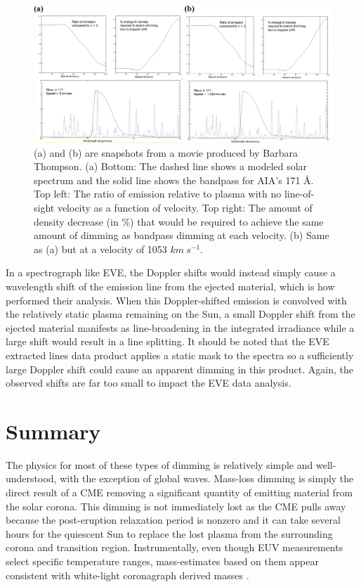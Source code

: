 \begin{figure}[!h]
    \caption[Bandpass dimming]{
        (a) and (b) are snapshots from a movie produced by Barbara Thompson. 
        (a) Bottom: The dashed line shows a modeled solar spectrum and the solid line shows the bandpass for AIA's 171 \AA. 
        Top left: The ratio of emission relative to plasma with no line-of-sight velocity as a function of velocity. 
        Top right: The amount of density decrease (in \%) that would be required to achieve the same amount of dimming as 
        bandpass dimming at each velocity. 
        (b) Same as (a) but at a velocity of 1053 $km\ s^{-1}$. 
    }
    \begin{center}
        \includegraphics[width=166mm]{Images/BandpassDimming.png}
    \end{center}
    \label{bandpassDimming}
\end{figure}

In a spectrograph like EVE, the Doppler shifts would instead simply cause a wavelength shift of the emission line from the ejected material, which is how \citet{Hudson2011} performed their analysis. When this Doppler-shifted emission is convolved with the relatively static plasma remaining on the Sun, a small Doppler shift from the ejected material manifests as line-broadening in the integrated irradiance while a large shift would result in a line splitting. It should be noted that the EVE extracted lines data product applies a static mask to the spectra so a sufficiently large Doppler shift could cause an apparent dimming in this product. Again, the observed shifts are far too small to impact the EVE data analysis.



\section{Summary}
The physics for most of these types of dimming is relatively simple and well-understood, with the exception of global waves. Mass-loss dimming is simply the direct result of a CME removing a significant quantity of emitting material from the solar corona. This dimming is not immediately lost as the CME pulls away because the post-eruption relaxation period is nonzero and it can take several hours for the quiescent Sun to replace the lost plasma from the surrounding corona and transition region. Instrumentally, even though EUV measurements select specific temperature ranges, mass-estimates based on them appear consistent with white-light coronagraph derived masses \citep{Aschwanden2009}. 

